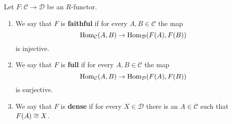 
\begin{definition}
  Let $F: \mathcal{C} \to \mathcal{D}$ be an $R$-functor.

  \begin{enumerate}
  \item We say that $F$ is \textbf{faithful} if for every $A,B \in \mathcal{C}$ the map\[
    \operatorname{Hom}_\mathcal{C}(A,B) \to \operatorname{Hom}_\mathcal{D}(F(A),F(B))\] is injective.
  \item We say that $F$ is \textbf{full} if for every $A,B \in \mathcal{C}$ the map \[\operatorname{Hom}_\mathcal{C}(A,B) \to \operatorname{Hom}_\mathcal{D}(F(A),F(B))\] is
    surjective.
  \item We say that $F$ is \textbf{dense} if for every $X \in \mathcal{D}$ there is an $A \in \mathcal{C}$
    such that $F(A) \cong X$.
  \end{enumerate}
\end{definition}


